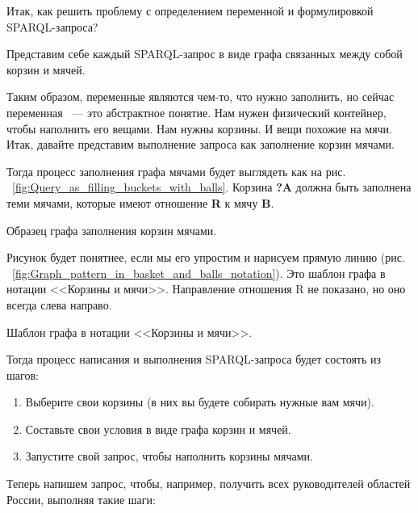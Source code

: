 Итак, как решить проблему с определением переменной и формулировкой SPARQL-запроса?

Представим себе каждый SPARQL-запрос в виде графа связанных между собой корзин и мячей.

Таким образом, переменные являются чем-то, что нужно заполнить, но сейчас переменная ~--- это абстрактное понятие. Нам нужен физический контейнер, чтобы наполнить его вещами. Нам нужны корзины. И вещи похожие на мячи. Итак, давайте представим выполнение запроса как заполнение корзин мячами.

Тогда процесс заполнения графа мячами будет выглядеть как на рис. ~\ref{fig:Query_as_filling_buckets_with_balls}. Корзина \textbf{?A} должна быть заполнена теми мячами, которые имеют отношение \textbf{R} к мячу \textbf{B}.

\begin{marginfigure}[-3.5cm]
	{
		\setlength{\fboxsep}{0pt}%
		\setlength{\fboxrule}{1pt}%
	}
    \caption{Образец графа заполнения корзин мячами.}
	\label{fig:Query_as_filling_buckets_with_balls}
\end{marginfigure}

Рисунок будет понятнее, если мы его упростим и нарисуем прямую линию (рис. ~\ref{fig:Graph_pattern_in_basket_and_balls_notation}). Это шаблон графа в нотации <<Корзины и мячи>>. Направление отношения R не показано, но оно всегда слева направо.

\begin{marginfigure}[1.0cm]
	{
		\setlength{\fboxsep}{0pt}%
		\setlength{\fboxrule}{1pt}%
	}
    \caption{Шаблон графа в нотации <<Корзины и мячи>>.}
	\label{fig:Graph_pattern_in_basket_and_balls_notation}
\end{marginfigure}


Тогда процесс написания и выполнения SPARQL-запроса будет состоять из шагов:
\begin{enumerate}
    \item Выберите свои корзины (в них вы будете собирать нужные вам мячи).
    \item Составьте свои условия в виде графа корзин и мячей.
    \item Запустите свой запрос, чтобы наполнить корзины мячами.
\end{enumerate}

Теперь напишем запрос, чтобы, например, получить всех руководителей областей России, выполняя такие шаги:

